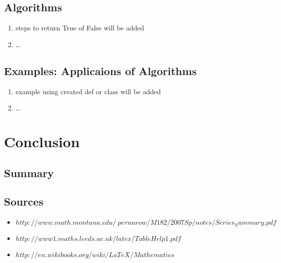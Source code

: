 \documentclass[12pt]{article}
\begin{document}
\subsection{Algorithms}
\begin{enumerate}
\item steps to return True of False will be added
\item \dots
\end{enumerate}
\subsection{Examples: Applicaions of Algorithms}
\begin{enumerate}
\item example using created def or class will be added
\item \dots
\end{enumerate}

\section{Conclusion}
\subsection{Summary}
\subsection{Sources}
\begin{itemize}
\item $http://www.math.montana.edu/~pernarow/M182/2007Sp/notes/Series_Summary.pdf$
\item $http://www1.maths.leeds.ac.uk/latex/TableHelp1.pdf$
\item $http://en.wikibooks.org/wiki/LaTeX/Mathematics$
\end{itemize}
\end{document}
